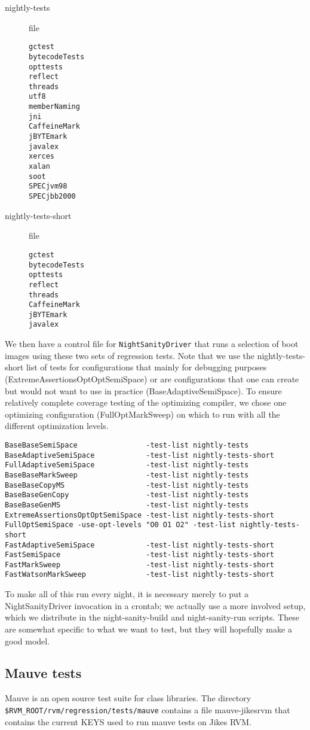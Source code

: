 \begin{description}
\item[nightly-tests] file
\begin{verbatim}
gctest
bytecodeTests
opttests
reflect
threads
utf8
memberNaming
jni
CaffeineMark
jBYTEmark
javalex 
xerces
xalan
soot
SPECjvm98 
SPECjbb2000 
\end{verbatim}
\item[nightly-tests-short] file
\begin{verbatim}
gctest
bytecodeTests
opttests
reflect
threads
CaffeineMark
jBYTEmark
javalex 
\end{verbatim}
\end{description}

 We then have a control file for {\tt{NightSanityDriver}} that runs a
selection of boot images using these two sets of regression tests.
Note that we use the nightly-tests-short list of tests for
configurations that mainly for debugging purposes
(ExtremeAssertionsOptOptSemiSpace) or are configurations that one can
create but would not want to use in practice (BaseAdaptiveSemiSpace).
To ensure relatively complete coverage testing of the optimizing
compiler, we chose one optimizing configuration (FullOptMarkSweep) on
which to run with all the different optimization levels.

\begin{verbatim}
BaseBaseSemiSpace                -test-list nightly-tests
BaseAdaptiveSemiSpace            -test-list nightly-tests-short
FullAdaptiveSemiSpace            -test-list nightly-tests
BaseBaseMarkSweep                -test-list nightly-tests
BaseBaseCopyMS                   -test-list nightly-tests
BaseBaseGenCopy                  -test-list nightly-tests
BaseBaseGenMS                    -test-list nightly-tests
ExtremeAssertionsOptOptSemiSpace -test-list nightly-tests-short
FullOptSemiSpace -use-opt-levels "O0 O1 O2" -test-list nightly-tests-short
FastAdaptiveSemiSpace            -test-list nightly-tests-short
FastSemiSpace                    -test-list nightly-tests-short
FastMarkSweep                    -test-list nightly-tests-short
FastWatsonMarkSweep              -test-list nightly-tests-short
\end{verbatim}

 To make all of this run every night, it is necessary merely to put a
NightSanityDriver invocation in a crontab; we actually use a more
involved setup, which we distribute in the night-sanity-build and
night-sanity-run scripts.  These are somewhat specific to what we want
to test, but they will hopefully make a good model.

\subsection{Mauve tests}
Mauve is an open source test suite for class libraries.  The directory 
{\tt{\$RVM\_ROOT/rvm/regression/tests/mauve}} contains a file
mauve-jikesrvm that contains the current KEYS used to run mauve tests
on Jikes RVM. 

\JikesTMFooter

\JavaTMFooter

